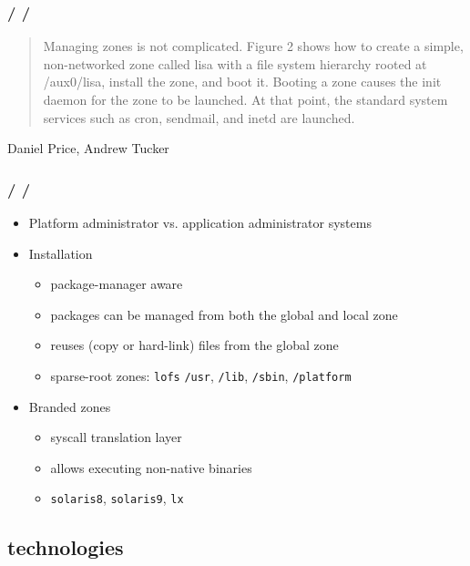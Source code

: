 \documentclass{beamer}
\newcommand{\autotitle}
{\frametitle{
    \secname
    \ifx\insertsubsection\empty
    \else
        /\subsecname
        \ifx\insertsubsubsection\empty\else/\subsubsecname\fi
    \fi}}
\begin{document}
\begin{frame}
    \autotitle
    \begin{quote}
        Managing zones is not complicated.  Figure 2 shows how to create a
        simple, non-networked zone called lisa with a file system hierarchy
        rooted at /aux0/lisa, install the zone, and boot it.  Booting a zone
        causes the init daemon for the zone to be launched.  At that point, the
        standard system services such as cron, sendmail, and inetd are
        launched.
    \end{quote}
    Daniel Price, Andrew Tucker \cite{solaris_zones}
\end{frame}

\begin{frame}
    \autotitle
    \begin{itemize}
        \item Platform administrator vs. application administrator systems
        \item Installation
        \begin{itemize}
            \item package-manager aware
            \item packages can be managed from both the global and local zone
            \item reuses (copy or hard-link) files from the global zone
            \item
                sparse-root zones: \texttt{lofs} \texttt{/usr}, \texttt{/lib},
                \texttt{/sbin}, \texttt{/platform}
        \end{itemize}
        \item Branded zones
        \begin{itemize}
            \item syscall translation layer
            \item allows executing non-native binaries
            \item \texttt{solaris8}, \texttt{solaris9}, \texttt{lx}
        \end{itemize}
    \end{itemize}
\end{frame}

\subsection{technologies}
\end{document}
